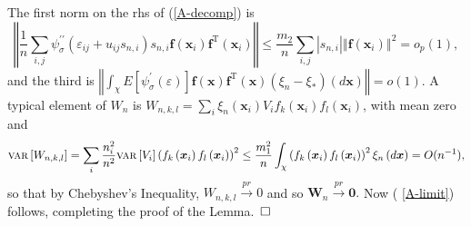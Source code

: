 \documentclass[times, authoryear, 12pt, twoside]{elsarticle}
\begin{document}
The first norm on the rhs of (\ref{A-decomp}) is 
\begin{equation*}
\left\Vert \frac{1}{n}\sum_{i,j}\psi _{\sigma }^{\prime \prime }\left(
\varepsilon _{ij}+u_{ij}s_{n,i}\right) s_{n,i}\boldsymbol{f}\left( 
\boldsymbol{x}_{i}\right) \boldsymbol{f}^{{\mathrm{\scriptscriptstyle T}}%
}\left( \boldsymbol{x}_{i}\right) \right\Vert \leq \frac{m_{2}}{n}%
\sum_{i,j}\left\vert s_{n,i}\right\vert \left\Vert \boldsymbol{f}\left( 
\boldsymbol{x}_{i}\right) \right\Vert ^{2}=o_{p}\left( 1\right) ,
\end{equation*}%
and the third is $\left\Vert \int_{\mathcal{\chi }}E\left[ \psi _{\sigma
}^{\prime }\left( \varepsilon \right) \right] \boldsymbol{f}\left( 
\boldsymbol{x}\right) \boldsymbol{f}^{{\mathrm{\scriptscriptstyle T}}}\left( 
\boldsymbol{x}\right) \left( \xi _{n}-\xi _{\ast }\right) \left( d%
\boldsymbol{x}\right) \right\Vert =o(1)$.  A typical element of $W_{n}$ is $%
W_{n,k,l}=\sum_{i}\xi _{n}\left( \boldsymbol{x}_{i}\right) V_{i}f_{k}\left( 
\boldsymbol{x}_{i}\right) f_{l}\left( \boldsymbol{x}_{i}\right) $, with mean
zero and 
\begin{equation*}
\text{\textsc{var}}\left[ W_{n,k,l}\right] =\sum_{i}\frac{n_{i}^{2}}{n^{2}}%
\text{\textsc{var}}\left[ V_{i}\right] \left( f_{k}\left( \boldsymbol{x}%
_{i}\right) f_{l}\left( \boldsymbol{x}_{i}\right) \right) ^{2}\leq \frac{%
m_{1}^{2}}{n}\int_{\mathcal{\chi }}\left( f_{k}\left( \boldsymbol{x}%
_{i}\right) f_{l}\left( \boldsymbol{x}_{i}\right) \right) ^{2}\xi _{n}\left(
d\boldsymbol{x}\right) =O(n^{-1}),
\end{equation*}%
so that by Chebyshev's Inequality, $W_{n,k,l}\overset{pr}{\rightarrow }0$
and so $\boldsymbol{W}_{n}\overset{pr}{\rightarrow }\boldsymbol{0}.$ Now (%
\ref{A-limit}) follows, completing the proof of the Lemma.\hfill\ $\square
\medskip $
\end{document}
